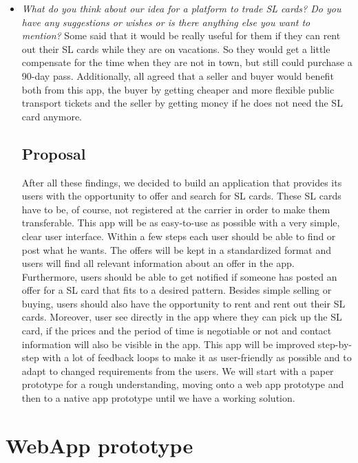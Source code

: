 \documentclass[11pt,twoside,a4paper]{report}
\begin{document}
\begin{itemize}
	\item \textit{What do you think about our idea for a platform to trade SL cards? Do you have any suggestions or wishes or is there anything else you want to mention?} Some said that it would be really useful for them if they can rent out their SL cards while they are on vacations. So they would get a little compensate for the time when they are not in town, but still could purchase a 90-day pass. Additionally, all agreed that a seller and buyer would benefit both from this app, the buyer by getting cheaper and more flexible public transport tickets and the seller by getting money if he does not need the SL card anymore.

\section{Proposal}

After all these findings, we decided to build an application that provides its users with the opportunity to offer and search for SL cards. These SL cards have to be, of course, not registered at the carrier in order to make them transferable. This app will be as easy-to-use as possible with a very simple, clear user interface. Within a few steps each user should be able to find or post what he wants. The offers will be kept in a standardized format and users will find all relevant information about an offer in the app. Furthermore, users should be able to get notified if someone has posted an offer for a SL card that fits to a desired pattern. 
Besides simple selling or buying, users should also have the opportunity to rent and rent out their SL cards. Moreover, user see directly in the app where they can pick up the SL card, if the prices and the period of time is negotiable or not and contact information will also be visible in the app.
This app will be improved step-by-step with a lot of feedback loops to make it as user-friendly as possible and to adapt to changed requirements from the users. We will start with a paper prototype for a rough understanding, moving onto a web app prototype and then to a native app prototype until we have a working solution.

\end{itemize}

\newpage

\chapter{WebApp prototype}
\end{document}
